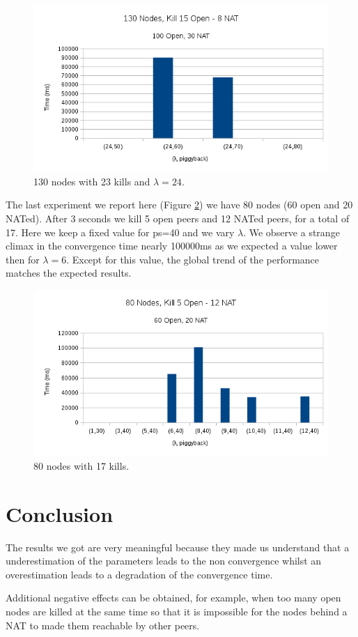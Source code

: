 \documentclass[10pt,a4paper]{proc}
\begin{document}
\begin{figure}
\centering
\includegraphics[scale=0.5]{metrics/kill15OpenFixedLamda.png}
\caption{130 nodes with 23 kills and $\lambda=24$.}
\label{kill15OpenFixed}
\end{figure}

The last experiment we report here (Figure \ref{kill5Open}) we have 80 nodes (60 open and 20 NATed). After 3 seconds we kill 5 open peers and 12 NATed peers, for a total of 17. Here we keep a fixed value for ps=40 and we vary $\lambda$. We observe a strange climax in the convergence time nearly 100000ms as we expected a value lower then for $\lambda=6$. Except for this value, the global trend of the performance matches the expected results.

\begin{figure}
\centering
\includegraphics[scale=0.5]{metrics/kill5Open.png}
\caption{80 nodes with 17 kills.}
\label{kill5Open}
\end{figure}

\section{Conclusion}

The results we got are very meaningful because they made us understand that a underestimation of the parameters leads to the non convergence whilst an overestimation leads to a degradation of the convergence time.

Additional negative effects can be obtained, for example, when too many open nodes are killed at the same time so that it is impossible for the nodes behind a NAT to made them reachable by other peers.
\end{document}

